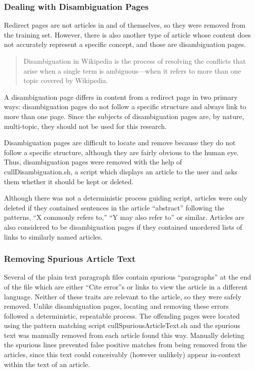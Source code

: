 \subsubsection{Dealing with Disambiguation Pages}

Redirect pages are not articles in and of themselves, so they were removed from the training set.
However, there is also another type of article whose content does not accurately represent a specific concept, and those are disambiguation pages.

\begin{quote}
Disambiguation in Wikipedia is the process of resolving the conflicts that arise when a single term is ambiguous---when it refers to more than one topic covered by Wikipedia.~\cite{wiki-disambiguation}
\end{quote}

A disambiguation page differs in content from a redirect page in two primary ways: disambiguation pages do not follow a specific structure and always link to more than one page.
Since the subjects of disambiguation pages are, by nature, multi-topic, they should not be used for this research.

Disambiguation pages are difficult to locate and remove because they do not follow a specific structure, although they are fairly obvious to the human eye.
Thus, disambiguation pages were removed with the help of cullDisambiguation.sh, a script which displays an article to the user and asks them whether it should be kept or deleted.

Although there was not a deterministic process guiding script, articles were only deleted if they contained sentences in the article ``abstract'' following the patterns, ``X commonly refers to,'' ``Y may also refer to'' or similar. Articles are also considered to be disambiguation pages if they contained unordered lists of links to similarly named articles.

\subsubsection{Removing Spurious Article Text}

Several of the plain text paragraph files contain spurious ``paragraphs'' at the end of the file which are either ``Cite error''s or links to view the article in a different language.
Neither of these traits are relevant to the article, so they were safely removed.
Unlike disambiguation pages, locating and removing these errors followed a deterministic, repeatable process.
The offending pages were located using the pattern matching script cullSpuriousArticleText.sh and the spurious text was manually removed from each article found this way.
Manually deleting the spurious lines prevented false positive matches from being removed from the articles, since this text could conceivably (however unlikely) appear in-context within the text of an article.

